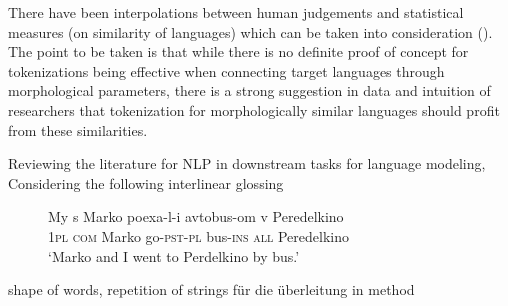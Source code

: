 There have been interpolations between human judgements and statistical measures (on similarity of languages) which can be taken into consideration (\cite{bentz-etal-2016-comparison}).
The point to be taken is that while there is no definite proof of concept for tokenizations being effective when connecting target languages through morphological parameters, there is a strong suggestion in data and intuition of researchers that tokenization for morphologically similar languages should profit from these similarities.

Reviewing the literature for \ac{NLP} in downstream tasks for language modeling,
Considering the following interlinear glossing


\begin{figure}[h]
    \label{fig:glossing}
    \begin{exe}
        \ex
        \gll  My s Marko poexa-l-i avtobus-om v Peredelkino \\
        1\textsc{pl} \textsc{com} Marko go-\textsc{pst}-\textsc{pl} bus-\textsc{ins} \textsc{all} Peredelkino \\
        \glt  `Marko and I went to Perdelkino by bus.'
    \end{exe}
\end{figure}


shape of words, repetition of strings für die überleitung in method
